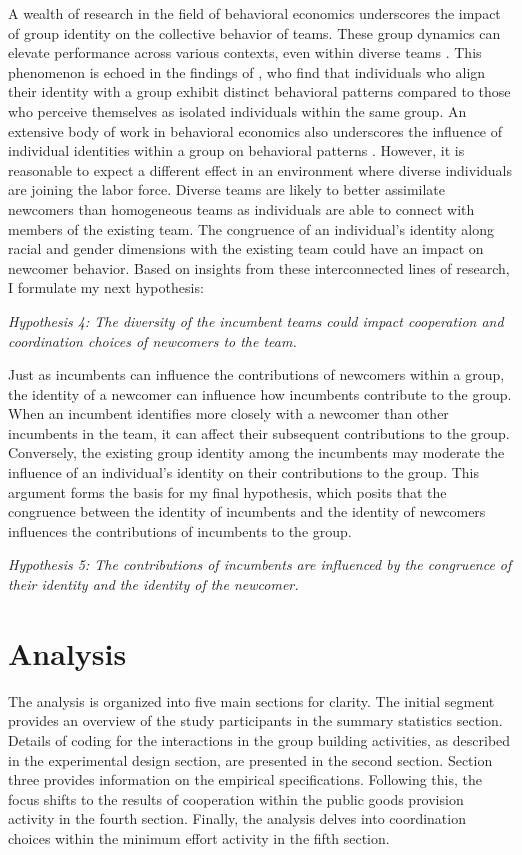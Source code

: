 \hspace  *{0mm} A wealth of research in the field of behavioral economics underscores the impact of group identity on the collective behavior of teams. These group dynamics can elevate performance across various contexts, even within diverse teams \citep{eg05}. This phenomenon is echoed in the findings of \citep{crrbcdfggllmrwy07}, who find that individuals who align their identity with a group exhibit distinct behavioral patterns compared to those who perceive themselves as isolated individuals within the same group. An extensive body of work in behavioral economics also underscores the influence of individual identities within a group on behavioral patterns \citep{har2009,chen11}. However, it is reasonable to expect a different effect in an environment where diverse individuals are joining the labor force. Diverse teams are likely to better assimilate newcomers than homogeneous teams as individuals are able to connect with members of the existing team. The congruence of an individual’s identity along racial and gender dimensions with the existing team could have an impact on newcomer behavior. Based on insights from these interconnected lines of research, I formulate my next hypothesis:

    \textit{Hypothesis 4: The diversity of the incumbent teams could impact cooperation and coordination choices of newcomers to the team.}

\hspace  *{0mm} Just as incumbents can influence the contributions of newcomers within a group, the identity of a newcomer can influence how incumbents contribute to the group. When an incumbent identifies more closely with a newcomer than other incumbents in the team, it can affect their subsequent contributions to the group. Conversely, the existing group identity among the incumbents may moderate the influence of an individual's identity on their contributions to the group. This argument forms the basis for my final hypothesis, which posits that the congruence between the identity of incumbents and the identity of newcomers influences the contributions of incumbents to the group.

    \textit{Hypothesis 5: The contributions of incumbents are influenced by the congruence of their identity and the identity of the newcomer.}


\section{Analysis} \label{sec:Analysis}
The analysis is organized into five main sections for clarity. The initial segment provides an overview of the study participants in the summary statistics section. Details of coding for the interactions in the group building activities, as described in the experimental design section, are presented in the second section. Section three provides information on the empirical specifications. Following this, the focus shifts to the results of cooperation within the public goods provision activity in the fourth section. Finally, the analysis delves into coordination choices within the minimum effort activity in the fifth section.

